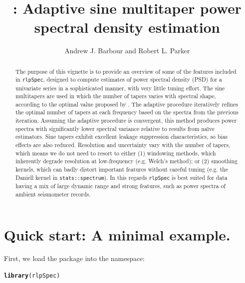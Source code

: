 \documentclass{article}\usepackage{graphicx, color}
\author{Andrew J. Barbour and Robert L. Parker}
\title{\rlp{}: Adaptive sine multitaper power spectral density estimation}
\makeatletter
\newcommand{\hlfunctioncall}[1]{\textcolor[rgb]{0.501960784313725,0,0.329411764705882}{\textbf{#1}}}%
\newenvironment{kframe}{%
 \def\at@end@of@kframe{}%
 \ifinner\ifhmode%
  \def\at@end@of@kframe{\end{minipage}}%
  \begin{minipage}{\columnwidth}%
 \fi\fi%
 \def\FrameCommand##1{\hskip\@totalleftmargin \hskip-\fboxsep
 \colorbox{shadecolor}{##1}\hskip-\fboxsep
     \hskip-\linewidth \hskip-\@totalleftmargin \hskip\columnwidth}%
 \MakeFramed {\advance\hsize-\width
   \@totalleftmargin\z@ \linewidth\hsize
   \@setminipage}}%
 {\par\unskip\endMakeFramed%
 \at@end@of@kframe}
\newenvironment{knitrout}{}{} %
\newcommand{\Rcmd}[1]{\texttt{#1}}
\newcommand{\rlp}[0]{\Rcmd{rlpSpec}}
\newcommand{\naive}[0]{na\"{\i}ve}
\makeatother
\begin{document}
\maketitle
\begin{abstract}
  The purpose of this vignette is to provide an overview of some of the
  features included in \rlp{}, designed to
  compute estimates of power spectral
  density (PSD) for a univariate series in a sophisticated manner,
  with very little tuning effort.
  The sine multitapers are used in which
  the number of tapers varies with spectral shape, according
  to the optimal value proposed by \citet{rs1995}.
  The adaptive procedure
  iteratively refines the optimal number of tapers at each frequency
  based on the spectra from the previous iteration.
  Assuming the adaptive procedure is convergent, 
  this method produces power spectra
  with significantly
  lower spectral variance 
  relative to results from \naive{} estimators.
  Sine tapers exhibit excellent
  leakage suppression characteristics, so bias effects
  are also reduced.
  Resolution and uncertainty vary with the number of tapers,
  which means we do
  not need to resort to either (1) windowing methods,
  which inherently degrade resolution at low-frequency
  (e.g. Welch's method); or (2) smoothing kernels,
  which can badly distort important features without careful tuning
  (e.g. the Daniell kernel in \Rcmd{stats::spectrum}).
  In this regards
  \rlp{} is best suited for data having a mix of
   large dynamic range and strong features, such
   as power spectra of ambient seismometer records.
\end{abstract}

\tableofcontents
\pagebreak

\section{Quick start: A minimal example.}
First, we load the package into the namespace:


\begin{knitrout}
\color{fgcolor}\begin{kframe}
\begin{alltt}
\hlfunctioncall{library}(rlpSpec)
\end{alltt}


{\ttfamily\noindent\itshape\color{messagecolor}{\#\# Loading required package: fftw}}

{\ttfamily\noindent\itshape\color{messagecolor}{\#\# Loaded rlpSpec (0.1.0) -- Adaptive multitaper spectrum estimation.}}\end{kframe}
\end{knitrout}
\end{document}
